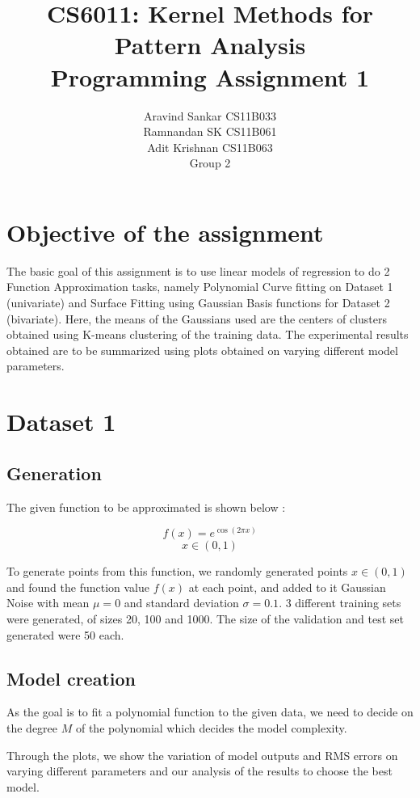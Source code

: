 \documentclass{article}
\begin{document}
\title{\textbf{CS6011: Kernel Methods for Pattern Analysis}
\\
\textbf{Programming Assignment 1}
}
\author{Aravind Sankar CS11B033 \\
Ramnandan SK CS11B061 \\
Adit Krishnan CS11B063 \\[0.2in]
Group 2
}
\maketitle
\tableofcontents 
\newpage
\section{Objective of the assignment}
The basic goal of this assignment is to use linear models of regression to do 2 Function Approximation tasks, namely Polynomial Curve fitting on Dataset 1 (univariate) and Surface Fitting using Gaussian Basis functions for Dataset 2 (bivariate). Here, the means of the Gaussians used are the centers of clusters obtained using K-means clustering of the training data. The experimental results obtained are to be summarized using plots obtained on varying different model parameters.
\section{Dataset 1}

\subsection{Generation}
The given function to be approximated is shown below :

\[ f(x) = e^{\cos(2 \pi x)} \]
\[ x \in (0,1) \]

\begin{flushleft}
To generate points from this function, we randomly generated points $x \in (0,1)$ and found the function value $f(x)$ at each point, and added to it Gaussian Noise with mean $\mu = 0$ and standard deviation $\sigma = 0.1$. 3 different training sets were generated, of sizes 20, 100 and 1000. The size of the validation and test set generated were 50 each.
\end{flushleft}

\subsection{Model creation}
\begin{flushleft}
As the goal is to fit a polynomial function to the given data, we need to decide on the degree $M$ of the polynomial which decides the model complexity. 

Through the plots, we show the variation of model outputs and RMS errors on varying different 
parameters and our analysis of the results to choose the best model.

\end{flushleft}
\newpage
\end{document}
